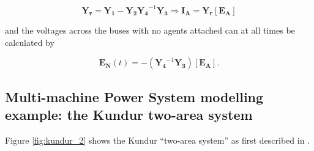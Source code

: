 \begin{equation} \mathbf{Y_r} = \mathbf{Y_1} - \mathbf{Y_2}\mathbf{Y_4}^{-1}\mathbf{Y_3} \Rightarrow \mathbf{I_A} = \mathbf{Y_r}\left[\mathbf{E_A}\right] \end{equation}

	\noindent and the voltages across the buses with no agents attached can at all times be calculated by

\begin{equation} \mathbf{E_N}(t) = -\left(\mathbf{Y_4}^{-1}\mathbf{Y_3}\right)\left[\mathbf{E_A}\right]. \end{equation}

\subsection{Multi-machine Power System modelling example: the Kundur two-area system} %

	Figure \ref{fig:kundur_2} shows the Kundur ``two-area system'' as first described in \cite{kleinFundamentalStudyInterarea1991}.

